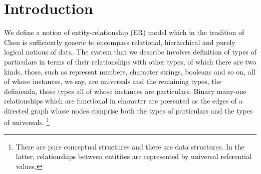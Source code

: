  \section{Introduction}

We  define a notion of entity-relationship (ER) model which in the tradition of Chen\cite{Chen1976} is sufficiently generic to encompass relational, hierarchical and purely logical  notions of data.
The system that we describe involves definition of types of particulars in terms of their relationships with other types, of which there are two kinds, those, such as represent numbers, character strings, booleans and so on, all of whose instances, we say, are universals and the remaining types, the definienda, those types all of whose instances are particulars. Binary many-one relationships which are functional in character are presented as the edges of a directed graph whose nodes comprise both the types of particulars and the types of universals. \footnote{There are pure conceptual structures and there are data structures. In the latter, relationships between entitites are represented by universal
referential values.}

